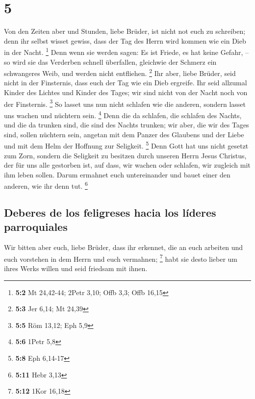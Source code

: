 \hypertarget{section-4}{%
\section{5}\label{section-4}}

 Von den Zeiten aber und Stunden, liebe Brüder, ist nicht
not euch zu schreiben;  denn ihr selbst wisset gewiss,
dass der Tag des Herrn wird kommen wie ein Dieb in der Nacht.
\footnote{\textbf{5:2} Mt 24,42-44; 2Petr 3,10; Offb 3,3; Offb 16,15}
 Denn wenn sie werden sagen: Es ist Friede, es hat keine
Gefahr, -- so wird sie das Verderben schnell überfallen, gleichwie der
Schmerz ein schwangeres Weib, und werden nicht entfliehen. \footnote{\textbf{5:3}
  Jer 6,14; Mt 24,39}  Ihr aber, liebe Brüder, seid nicht
in der Finsternis, dass euch der Tag wie ein Dieb ergreife.
 Ihr seid allzumal Kinder des Lichtes und Kinder des
Tages; wir sind nicht von der Nacht noch von der Finsternis. \footnote{\textbf{5:5}
  Röm 13,12; Eph 5,9}  So lasset uns nun nicht schlafen
wie die anderen, sondern lasset uns wachen und nüchtern sein.
\footnote{\textbf{5:6} 1Petr 5,8}  Denn die da schlafen,
die schlafen des Nachts, und die da trunken sind, die sind des Nachts
trunken;  wir aber, die wir des Tages sind, sollen
nüchtern sein, angetan mit dem Panzer des Glaubens und der Liebe und mit
dem Helm der Hoffnung zur Seligkeit. \footnote{\textbf{5:8} Eph 6,14-17}
 Denn Gott hat uns nicht gesetzt zum Zorn, sondern die
Seligkeit zu besitzen durch unseren Herrn Jesus Christus,
 der für uns alle gestorben ist, auf dass, wir wachen
oder schlafen, wir zugleich mit ihm leben sollen.  Darum
ermahnet euch untereinander und bauet einer den anderen, wie ihr denn
tut. \footnote{\textbf{5:11} Hebr 3,13}

\hypertarget{deberes-de-los-feligreses-hacia-los-luxedderes-parroquiales}{%
\subsection{Deberes de los feligreses hacia los líderes
parroquiales}\label{deberes-de-los-feligreses-hacia-los-luxedderes-parroquiales}}

 Wir bitten aber euch, liebe Brüder, dass ihr erkennet,
die an euch arbeiten und euch vorstehen in dem Herrn und euch vermahnen;
\footnote{\textbf{5:12} 1Kor 16,18}  habt sie desto
lieber um ihres Werks willen und seid friedsam mit ihnen.


